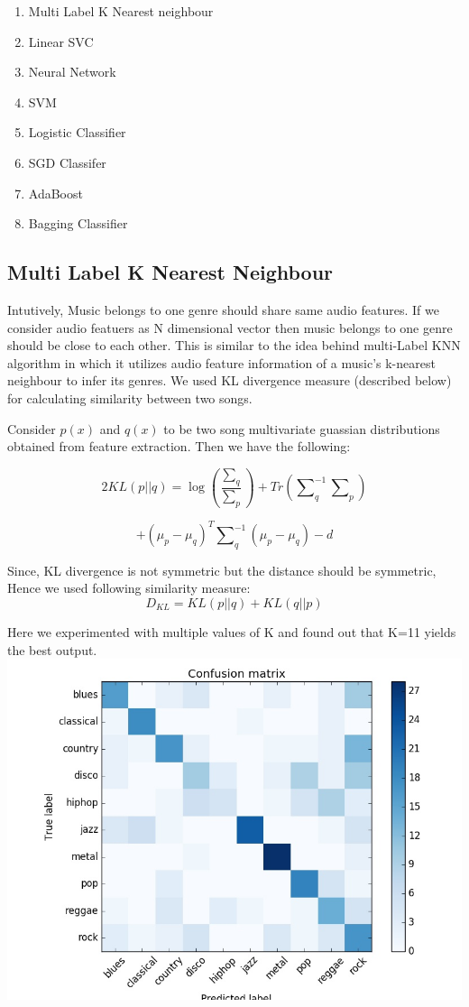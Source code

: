 \documentclass[conference]{IEEEtran}
\begin{document}
\begin{enumerate}
  \item Multi Label K Nearest neighbour
  \item Linear SVC
  \item Neural Network
  \item SVM
  \item Logistic Classifier
  \item SGD Classifer
  \item AdaBoost
  \item Bagging Classifier
\end{enumerate}


\subsection{Multi Label K Nearest Neighbour}
\label{sub:Multi Label K Nearest Neighbour}

Intutively, Music belongs to one genre should share same audio features. If we consider audio featuers as N dimensional vector then music belongs to one genre should be close to each other. This is similar to the idea behind multi-Label KNN algorithm in which it utilizes audio feature information of a music's k-nearest neighbour to infer its genres. We used KL divergence measure (described below) for calculating similarity between two songs.

Consider $ p(x) $ and $ q(x) $ to be two song multivariate guassian distributions obtained from feature extraction. Then we have the following:

$$ 2KL(p||q) = \log{\left(\frac{\sum\nolimits_q}{\sum\nolimits_p}\right)} + Tr\left(\sum\nolimits_q^{-1}\sum\nolimits_p\right) $$

$$    + {\left(\mu_p - \mu_q\right)}^{T}\sum\nolimits_q^{-1}(\mu_p - \mu_q) - d $$


Since, KL divergence is not symmetric but the distance should be symmetric, Hence we used following similarity measure:
$$ {D}_{KL} =  KL\left(p||q\right) + KL\left(q||p\right) $$

Here we experimented with multiple values of K and found out that K=11 yields the best output.
\includegraphics[width=\columnwidth]{KNN}
\end{document}
